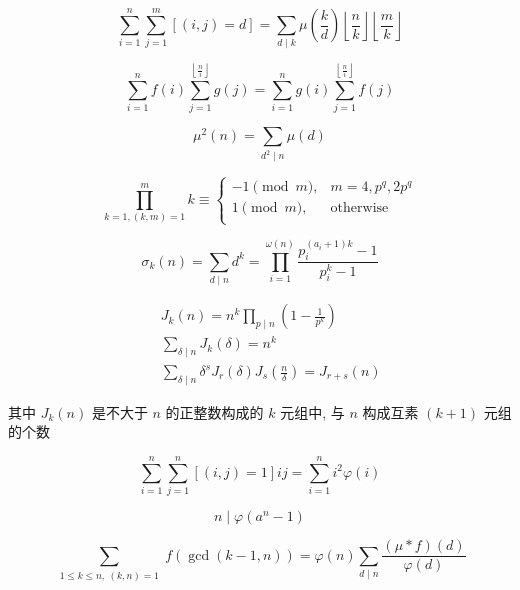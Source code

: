\begin{equation}
    \sum_{i = 1} ^ n \sum_{j = 1} ^ m \left[(i, j) = d\right] = \sum_{d \mid  k} \mu\left( \frac k d \right) \left\lfloor \frac n k \right\rfloor \left\lfloor \frac m k \right\rfloor
\end{equation}

\begin{equation}
    \sum_{i = 1} ^ n f(i) \sum_{j = 1} ^ {\left\lfloor \frac n i \right\rfloor} g(j) = \sum_{i = 1} ^ n g(i) \sum_{j = 1} ^ {\left\lfloor \frac n i \right\rfloor} f(j)
\end{equation}

\begin{equation}
    \mu^2(n) = \sum_{d^2 \mid n} \mu (d)
\end{equation}

\begin{equation}
    \prod_{k=1,(k, m) = 1}^{m} k \equiv
    \begin{cases}
        -1 \pmod m, & m = 4, p^q, 2p^q \\
        1 \pmod m,  & \text{otherwise} \\
    \end{cases}
\end{equation}

\begin{equation}
    \sigma_k(n) = \sum_{d\mid n}d^k = \prod_{i=1}^{\omega(n)}\frac{p_i^{(a_i+1)k}-1}{p_i^k-1}
\end{equation}

\begin{eqnarray}
    &&J_k(n) = n^k\prod_{p\mid n}\left(1-\frac{1}{p^k}\right) \\
    &&\sum_{\delta\mid n}J_k(\delta) = n^k \\
    &&\sum_{\delta\mid n}\delta^sJ_r(\delta)J_s\left(\frac{n}{\delta}\right) = J_{r+s}(n)
\end{eqnarray}

其中 \(J_k(n)\) 是不大于 \(n\) 的正整数构成的 \(k\) 元组中, 与 \(n\) 构成互素 \((k + 1)\) 元组的个数

\begin{equation}
    \sum_{i=1}^{n} \sum_{j=1}^{n} [(i,j)=1]ij =  \sum_{i=1}^{n} i^2\varphi(i)
\end{equation}

\begin{equation}
    n\mid \varphi(a^n-1)
\end{equation}

\begin{equation}
    \sum_{\substack{1 \leq k \leq n,~(k, n) = 1}}f(\gcd(k-1, n)) = \varphi(n)\sum_{d\mid n}\frac{(\mu*f)(d)}{\varphi(d)}
\end{equation}


